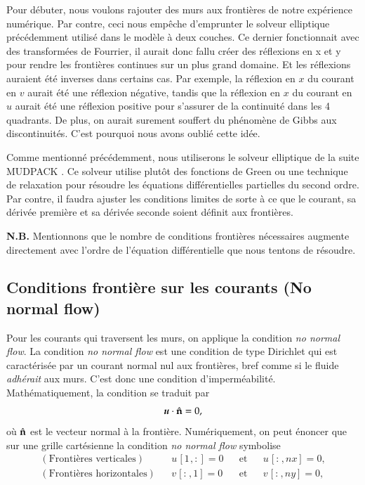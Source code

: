 \documentclass[10pt]{article}
\numberwithin{equation}{section}
\newcommand{\nvf}{\hat{\vb{n}}}
\newcommand{\uu}{\vb*{u}}
\newcommand{\pt}{\hspace{1pt}}
\begin{document}
Pour débuter, nous voulons rajouter des murs aux frontières de notre expérience numérique.
Par contre, ceci nous empêche d'emprunter le solveur elliptique précédemment utilisé dans le modèle à deux couches.
Ce dernier fonctionnait avec des transformées de Fourrier, il aurait donc fallu créer des réflexions en x et y pour rendre les frontières continues sur un plus grand domaine.
Et les réflexions auraient été inverses dans certains cas.
Par exemple, la réflexion en \(x\) du courant en \(v\) aurait été une réflexion négative, tandis que la réflexion en \(x\) du courant en \(u\) aurait été une réflexion positive pour s'assurer de la continuité dans les 4 quadrants.
De plus, on aurait surement souffert du phénomène de Gibbs aux discontinuités.
C'est pourquoi nous avons oublié cette idée.\bigskip

Comme mentionné précédemment, nous utiliserons le solveur elliptique de la suite MUDPACK \citep{adams1989mudpack}.
Ce solveur utilise plutôt des fonctions de Green ou une technique de relaxation pour résoudre les équations différentielles partielles du second ordre.
Par contre, il faudra ajuster les conditions limites de sorte à ce que le courant, sa dérivée première et sa dérivée seconde soient définit aux frontières.\bigskip

\textbf{N.B.} Mentionnons que le nombre de conditions frontières nécessaires augmente directement avec l'ordre de l'équation différentielle que nous tentons de résoudre.

\subsection{Conditions frontière sur les courants (No normal flow)}
\label{sec:org0c2cf02}
Pour les courants qui traversent les murs, on applique la condition \emph{no normal flow}.
La condition \emph{no normal flow} est une condition de type Dirichlet qui est caractérisée par un courant normal nul aux frontières, bref comme si le fluide \emph{adhérait} aux murs.
C'est donc une condition d'imperméabilité.
Mathématiquement, la condition se traduit par
\begin{equation}
\uu \cdot \nvf =0,
\end{equation}
où \(\nvf\) est le vecteur normal à la frontière.
Numériquement, on peut énoncer que sur une grille cartésienne la condition \emph{no normal flow} symbolise
\begin{subequations}
\begin{align}
  &&(\text{Frontières verticales}) && u\pt[1\pt,:] = 0 && \text{et} && u\pt[:\pt,nx] = 0,&& \\
  &&(\text{Frontières horizontales}) && v\pt[:\pt,1] = 0 && \text{et} && v\pt[:\pt,ny] = 0,&&  
\end{align}
\end{subequations}
\end{document}
